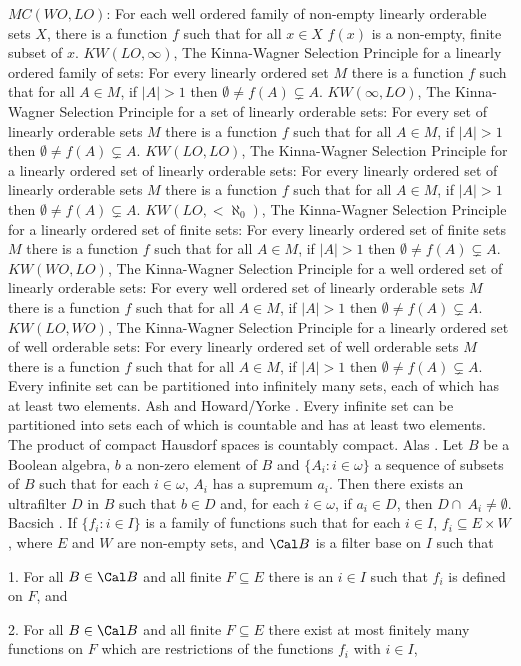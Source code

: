 \medskip
{} $MC(WO,LO)$: For each well ordered family
of non-empty linearly orderable sets $X$, there is a function $f$ such
that for all $x\in X$ $f(x)$ is a non-empty, finite subset of $x$.
\medskip
{} $KW(LO,\infty)$, The Kinna-Wagner Selection
Principle for a linearly ordered family of sets: For every linearly
ordered set $M$ there is a function $f$ such that for all $A\in M$,
if $|A|>1$ then $\emptyset\neq f(A)\subsetneq A$.
\medskip
{} $KW(\infty,LO)$, The Kinna-Wagner Selection
Principle for a set of linearly orderable sets: For every set of
linearly orderable sets $M$ there is a function $f$ such that for all
$A\in M$, if $|A|>1$ then $\emptyset\neq f(A)\subsetneq A$.
\medskip
{} $KW(LO,LO)$, The Kinna-Wagner Selection
Principle for a linearly ordered set of linearly orderable sets:
For every linearly ordered set of linearly orderable sets $M$ there
is a function $f$ such that for all $A\in M$, if $|A|>1$ then
$\emptyset\neq f(A)\subsetneq A$.
\medskip
{} $KW(LO,<\aleph_0)$, The Kinna-Wagner Selection
Principle for a linearly ordered set of finite sets: For every linearly
ordered set of finite sets $M$ there is a function $f$ such that for all
$A\in M$, if $|A|>1$ then $\emptyset\neq f(A)\subsetneq A$.
\medskip
{} $KW(WO,LO)$, The Kinna-Wagner Selection
Principle for a well ordered set of linearly orderable sets:
For every well ordered set of linearly orderable sets $M$ there
is a function $f$ such that for all $A\in M$, if $|A|>1$ then
$\emptyset\neq f(A)\subsetneq A$.
\medskip
{} $KW(LO,WO)$, The Kinna-Wagner Selection
Principle for a linearly ordered set of well orderable sets:
For every linearly ordered set of well orderable sets $M$ there
is a function $f$ such that for all $A\in M$, if $|A|>1$ then
$\emptyset\neq f(A)\subsetneq A$.
\medskip
{} Every infinite set can be partitioned into
infinitely many sets, each of which has at least two elements. \ac{Ash}
\cite{1983} and \ac{Howard/Yorke} \cite{1989}.
\medskip
{} Every infinite set can be partitioned into sets
each of which is countable and has at least two elements.
\medskip
{} The product of compact Hausdorf spaces is
countably compact. \ac{Alas} \cite{1994}.
\medskip
{}  Let $B$ be a Boolean algebra, $b$ a non-zero
element of $B$ and $\{A_i: i\in\omega\}$ a sequence of subsets of $B$
such that for each $i\in\omega$, $A_i$ has a supremum $a_i$. Then there
exists an ultrafilter $D$ in $B$ such that $b\in D$ and, for each
$i\in\omega$, if $a_i\in D$, then $D\cap\ A_i\neq\emptyset$.
\ac{Bacsich} \cite{1972b}.
\medskip
{} If $\{f_i: i\in I\}$ is a family of functions
such that for each $i\in I$, $f_i\subseteq E\times W$, where $E$ and
$W$ are non-empty sets, and $\Cal B$ is a filter base on $I$ such that
\item {1.} For all $B\in\Cal B$ and all finite $F\subseteq E$ there
is an $i\in I$ such that $f_i$ is defined on $F$, and
\item {2.} For all $B \in\Cal B$ and all finite $F\subseteq E$ there
exist at most finitely many functions on $F$ which are restrictions
of the functions $f_i$ with $i\in I$,

